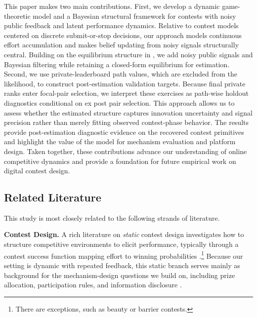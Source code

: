 \documentclass[mnsc]{informs3}
\begin{document}
This paper makes two main contributions.
First, we develop a dynamic game-theoretic model and a Bayesian structural framework for contests with noisy public feedback and latent performance dynamics.
Relative to contest models centered on discrete submit-or-stop decisions, our approach models continuous effort accumulation and makes belief updating from noisy signals structurally central.
Building on the equilibrium structure in \citet{Ryvkin2022Fight}, we add noisy public signals and Bayesian filtering while retaining a closed-form equilibrium for estimation.
Second, we use private-leaderboard path values, which are excluded from the likelihood, to construct post-estimation validation targets. Because final private ranks enter focal-pair selection, we interpret these exercises as path-wise holdout diagnostics conditional on ex post pair selection.
This approach allows us to assess whether the estimated structure captures innovation uncertainty and signal precision rather than merely fitting observed contest-phase behavior.
The results provide post-estimation diagnostic evidence on the recovered contest primitives and highlight the value of the model for mechanism evaluation and platform design.
Taken together, these contributions advance our understanding of online competitive dynamics and provide a foundation for future empirical work on digital contest design.



\subsection{Related Literature}

This study is most closely related to the following strands of literature.

\textbf{Contest Design.}
A rich literature on \textit{static} contest design \citep{ales2017optimal_award} investigates how to structure competitive environments to elicit performance, typically through a contest success function mapping effort to winning probabilities \citep{skaperdas1996contest}.\footnote{There are exceptions, such as beauty or barrier contests.}
Because our setting is dynamic with repeated feedback, this static branch serves mainly as background for the mechanism-design questions we build on, including prize allocation, participation rules, and information disclosure \citep{moldovanu2001optimal, ales2021number_of_players, bergemann2022optimal}.
\end{document}
